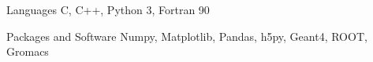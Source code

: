 
\begin{cvskills}
  \cvskill
    {Languages} %
    {C, C++, Python 3, Fortran 90} %

  \cvskill
    {Packages and Software} %
    {Numpy, Matplotlib, Pandas, h5py,  Geant4, ROOT, Gromacs} %
\end{cvskills}
